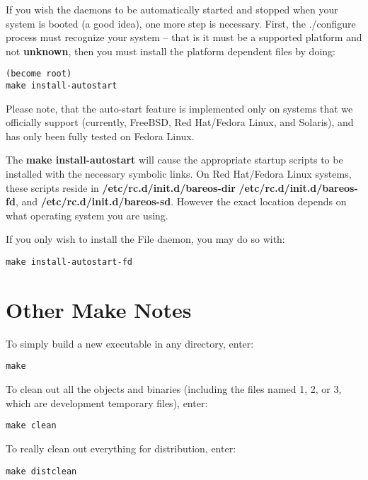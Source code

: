 If you wish the daemons to be automatically started and stopped when your
system is booted (a good idea), one more step is necessary. First, the
./configure process must recognize your system -- that is it must be a
supported platform and not {\bf unknown}, then you must install the platform
dependent files by doing:

\footnotesize
\begin{verbatim}
(become root)
make install-autostart
\end{verbatim}
\normalsize

Please note, that the auto-start feature is implemented only on systems
that we officially support (currently, FreeBSD, Red Hat/Fedora Linux, and
Solaris), and has only been fully tested on Fedora Linux.

The {\bf make install-autostart} will cause the appropriate startup scripts
to be installed with the necessary symbolic links.  On Red Hat/Fedora Linux
systems, these scripts reside in {\bf /etc/rc.d/init.d/bareos-dir} {\bf
/etc/rc.d/init.d/bareos-fd}, and {\bf /etc/rc.d/init.d/bareos-sd}.  However
the exact location depends on what operating system you are using.

If you only wish to install the File daemon, you may do so with:

\footnotesize
\begin{verbatim}
make install-autostart-fd
\end{verbatim}
\normalsize

\section{Other Make Notes}

To simply build a new executable in any directory, enter:

\footnotesize
\begin{verbatim}
make
\end{verbatim}
\normalsize

To clean out all the objects and binaries (including the files named 1, 2, or
3, which are development temporary files), enter:

\footnotesize
\begin{verbatim}
make clean
\end{verbatim}
\normalsize

To really clean out everything for distribution, enter:

\footnotesize
\begin{verbatim}
make distclean
\end{verbatim}
\normalsize

